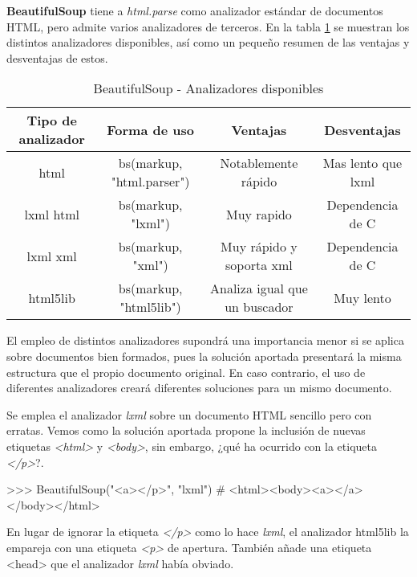 \textbf{BeautifulSoup} tiene a \emph{html.parse} como analizador estándar de documentos HTML, pero admite 
varios analizadores de terceros. En la tabla \ref{tab:beautifulsoup - analizadores disponibles} se muestran 
los distintos analizadores disponibles, así como un pequeño resumen de las ventajas y desventajas de estos.

\begin{table}[h]
  \begin{center}
  \begin{tabular}{| c | c | c | c |}
  \hline \textbf{Tipo de analizador} & \textbf{Forma de uso} & \textbf{Ventajas} & \textbf{Desventajas} \\ \hline
  html & bs(markup, "html.parser") & Notablemente rápido & Mas lento que lxml \\
  lxml html & bs(markup, "lxml") & Muy rapido & Dependencia de C \\
  lxml xml & bs(markup, "xml") & Muy rápido y soporta xml & Dependencia de C \\
  html5lib & bs(markup, "html5lib") & Analiza igual que un buscador & Muy lento \\ \hline
  \end{tabular}
  \caption{BeautifulSoup - Analizadores disponibles}
  \label{tab:beautifulsoup - analizadores disponibles}
  \end{center}
\end{table}

El empleo de distintos analizadores supondrá una importancia menor si se aplica sobre documentos bien 
formados, pues la solución aportada presentará la misma estructura que el propio documento original. En 
caso contrario, el uso de diferentes analizadores creará diferentes soluciones para un mismo documento. 

Se emplea el analizador \emph{lxml} sobre un documento HTML sencillo pero con erratas. Vemos como la solución 
aportada propone la inclusión de nuevas etiquetas \emph{<html>} y \emph{<body>}, sin embargo, ¿qué ha 
ocurrido con la etiqueta \emph{</p>}?.

\begin{Schunk}
  \begin{Soutput}
    >>> BeautifulSoup("<a></p>", "lxml")
    # <html><body><a></a></body></html>
  \end{Soutput}
\end{Schunk}

En lugar de ignorar la etiqueta \emph{</p>} como lo hace \emph{lxml}, el analizador html5lib la empareja 
con una etiqueta \emph{<p>} de apertura. También añade una etiqueta <head> que el analizador \emph{lxml} 
había obviado.

